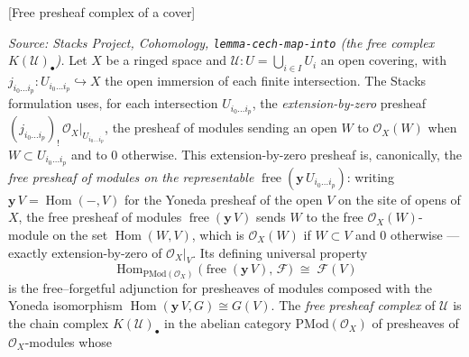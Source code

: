 \begin{definition}

[Free presheaf complex of a cover]
  \label{mk-def:cech_free_presheaf_complex}

  \textit{Source: Stacks Project, Cohomology,
  \texttt{lemma-cech-map-into} (the free complex \(K(\mathcal{U})_\bullet\)).}
  Let \(X\) be a ringed space and \(\mathcal{U} : U = \bigcup_{i \in I} U_i\) an
  open covering, with \(j_{i_0 \ldots i_p} : U_{i_0 \ldots i_p} \hookrightarrow X\)
  the open immersion of each finite intersection. The Stacks formulation uses, for
  each intersection \(U_{i_0 \ldots i_p}\), the \emph{extension-by-zero} presheaf
  \((j_{i_0 \ldots i_p})_{!}\,\mathcal{O}_X|_{U_{i_0 \ldots i_p}}\), the presheaf of
  modules sending an open \(W\) to \(\mathcal{O}_X(W)\) when
  \(W \subset U_{i_0 \ldots i_p}\) and to \(0\) otherwise. This extension-by-zero
  presheaf is, canonically, the \emph{free presheaf of modules on the representable}
  \(\operatorname{free}(\mathbf{y}\,U_{i_0 \ldots i_p})\): writing
  \(\mathbf{y}\,V = \operatorname{Hom}(-, V)\) for the Yoneda presheaf of the open
  \(V\) on the site of opens of \(X\), the free presheaf of modules
  \(\operatorname{free}(\mathbf{y}\,V)\) sends \(W\) to the free
  \(\mathcal{O}_X(W)\)-module on the set \(\operatorname{Hom}(W, V)\), which is
  \(\mathcal{O}_X(W)\) if \(W \subset V\) and \(0\) otherwise — exactly
  extension-by-zero of \(\mathcal{O}_X|_V\). Its defining universal property
  \[
    \operatorname{Hom}_{\mathrm{PMod}(\mathcal{O}_X)}\bigl(
      \operatorname{free}(\mathbf{y}\,V),\, \mathcal{F}\bigr)
    \;\cong\; \mathcal{F}(V)
  \]
  is the free–forgetful adjunction for presheaves of modules composed with the
  Yoneda isomorphism \(\operatorname{Hom}(\mathbf{y}\,V, G) \cong G(V)\). The
  \emph{free presheaf complex} of \(\mathcal{U}\) is the chain complex
  \(K(\mathcal{U})_\bullet\) in the abelian category
  \(\mathrm{PMod}(\mathcal{O}_X)\) of presheaves of \(\mathcal{O}_X\)-modules whose

\end{definition}
